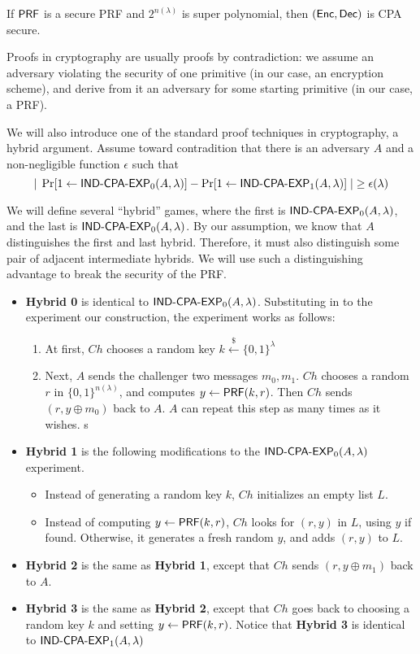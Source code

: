 \begin{theorem} If ${\sf PRF}$ is a secure PRF and $2^{n(\lambda)}$ is super polynomial, then $({\sf Enc},{\sf Dec})$ is CPA secure.
\end{theorem}

Proofs in cryptography are usually proofs by contradiction: we assume an adversary violating the security of one primitive (in our case, an encryption scheme), and derive from it an adversary for some starting primitive (in our case, a PRF).
	
We will also introduce one of the standard proof techniques in cryptography, a hybrid argument.  Assume toward contradition that there is an adversary $A$ and a non-negligible function $\epsilon$ such that
\[|\;\Pr[1\gets\text{\sf IND-CPA-EXP}_0(A,\lambda)]-\Pr[1\gets\text{\sf IND-CPA-EXP}_1(A,\lambda)]\;|\geq \epsilon(\lambda)\]

We will define several ``hybrid'' games, where the first is $\text{\sf IND-CPA-EXP}_0(A,\lambda)$, and the last is $\text{\sf IND-CPA-EXP}_0(A,\lambda)$.  By our assumption, we know that $A$ distinguishes the first and last hybrid.  Therefore, it must also distinguish some pair of adjacent intermediate hybrids.  We will use such a distinguishing advantage to break the security of the PRF.
\begin{itemize}
	\item {\bf Hybrid 0} is identical to $\text{\sf IND-CPA-EXP}_0(A,\lambda)$.  Substituting in to the experiment our construction, the experiment works as follows:
	\begin{enumerate}
		\item At first, $Ch$ chooses a random key $k\stackrel{\$}{\gets}\{0,1\}^\lambda$
		\item Next, $A$ sends the challenger two messages $m_0,m_1$.  $Ch$ chooses a random $r$ in $\{0,1\}^{n(\lambda)}$, and computes $y\gets{\sf PRF}(k,r)$.  Then $Ch$ sends $(r,y\oplus m_0)$ back to $A$.  $A$ can repeat this step as many times as it wishes.
s	\end{enumerate}
	\item {\bf Hybrid 1} is the following modifications to the $\text{\sf IND-CPA-EXP}_0(A,\lambda)$ experiment.  
	\begin{itemize}
		\item Instead of generating a random key $k$, $Ch$ initializes an empty list $L$.
		\item Instead of computing $y\gets{\sf PRF}(k,r)$, $Ch$ looks for $(r,y)$ in $L$, using $y$ if found.  Otherwise, it generates a fresh random $y$, and adds $(r,y)$ to $L$.
	\end{itemize} 
	\item {\bf Hybrid 2} is the same as {\bf Hybrid 1}, except that $Ch$ sends $(r,y\oplus m_1)$ back to $A$.
	\item {\bf Hybrid 3} is the same as {\bf Hybrid 2}, except that $Ch$ goes back to choosing a random key $k$ and setting $y\gets{\sf PRF}(k,r)$.  Notice that {\bf Hybrid 3} is identical to $\text{\sf IND-CPA-EXP}_1(A,\lambda)$
\end{itemize}

